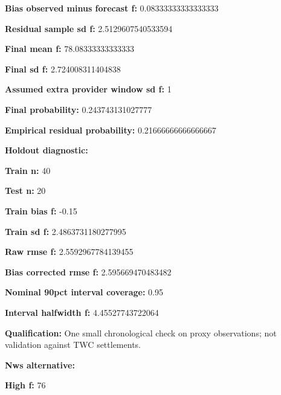 \documentclass[11pt]{article}
\begin{document}
\par\noindent\textbf{Bias observed minus forecast f:} 0.08333333333333333

\par\noindent\textbf{Residual sample sd f:} 2.5129607540533594

\par\noindent\textbf{Final mean f:} 78.08333333333333

\par\noindent\textbf{Final sd f:} 2.724008311404838

\par\noindent\textbf{Assumed extra provider window sd f:} 1

\par\noindent\textbf{Final probability:} 0.243743131027777

\par\noindent\textbf{Empirical residual probability:} 0.21666666666666667

\par\noindent\textbf{Holdout diagnostic:} \par \par\noindent\textbf{Train n:} 40

\par\noindent\textbf{Test n:} 20

\par\noindent\textbf{Train bias f:} -0.15

\par\noindent\textbf{Train sd f:} 2.4863731180277995

\par\noindent\textbf{Raw rmse f:} 2.5592967784139455

\par\noindent\textbf{Bias corrected rmse f:} 2.595669470483482

\par\noindent\textbf{Nominal 90pct interval coverage:} 0.95

\par\noindent\textbf{Interval halfwidth f:} 4.45527743722064

\par\noindent\textbf{Qualification:} One small chronological check on proxy observations; not validation against TWC settlements.

\par\noindent\textbf{Nws alternative:} \par \par\noindent\textbf{High f:} 76
\end{document}
